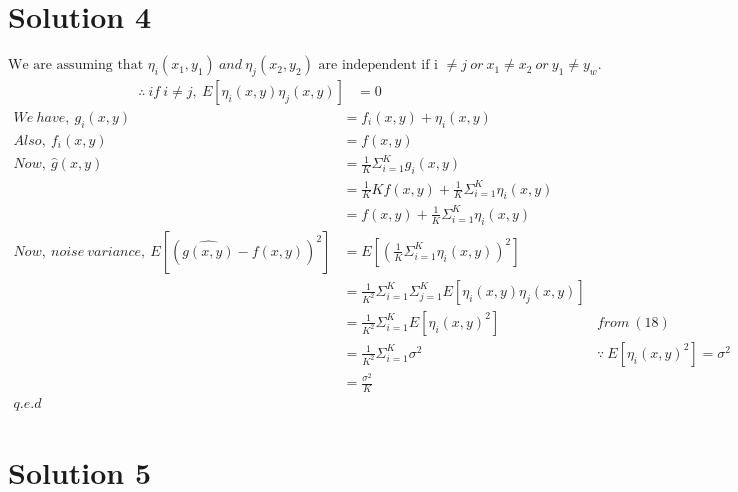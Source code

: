 \documentclass[a4paper,fleqn,11pt]{article}
\theoremstyle{mytheor}
\begin{document}
\section*{Solution 4}
$$\text{We are assuming that }\eta_i (x_1, y_1)\ and\ \eta_j (x_2, y_2)\text{ are independent if i }\neq j\ or\ x_1 \neq x_2\ or\ y_1 \neq y_w.$$
\begin{align}
\therefore\ if\ i \neq j,\ E[\eta_i(x, y)\eta_j(x, y)] & = 0
\end{align}
\begin{align*}
We\ have,\ g_i(x, y) & = f_i(x, y) + \eta_i(x, y) \\
Also,\ f_i(x, y) & = f(x, y) \\
Now,\ \hat{g}(x, y)& = \frac{1}{K} \Sigma_{i = 1}^K g_i(x, y) \\
& = \frac{1}{K}K f(x, y) + \frac{1}{K}\Sigma_{i = 1}^K \eta_i(x, y) \\
& = f(x, y) + \frac{1}{K}\Sigma_{i = 1}^K \eta_i(x, y) \\
Now,\ noise\ variance,\ E[(\hat{g(x, y)} - f(x, y))^2] & = E[(\frac{1}{K}\Sigma_{i = 1}^K \eta_i(x, y))^2] \\
& = \frac{1}{K^2}\Sigma_{i = 1}^K\Sigma_{j = 1}^K E[\eta_i(x, y)\eta_j(x, y)] \\
& = \frac{1}{K^2}\Sigma_{i = 1}^K E[\eta_i(x, y)^2] & from\ (18) \\
& = \frac{1}{K^2}\Sigma_{i = 1}^K \sigma^2 & \because\ E[\eta_i(x, y)^2] = \sigma^2 \\
& = \frac{\sigma^2}{K} \\
q.e.d
\end{align*}

\section*{Solution 5}
\end{document}
